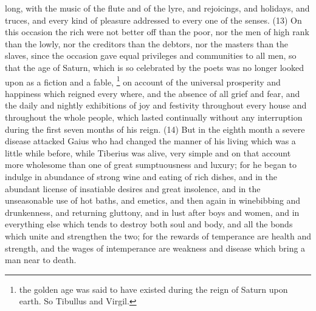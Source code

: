 long, with the music of the flute and of the lyre, and rejoicings, and holidays, and truces, and every
kind of pleasure addressed to every one of the senses. (13) On this occasion the rich were not
better off than the poor, nor the men of high rank than the lowly, nor the creditors than the debtors,
nor the masters than the slaves, since the occasion gave equal privileges and communities to all
men, so that the age of Saturn, which is so celebrated by the poets was no longer looked upon as
a fiction and a fable, \footnote{the golden age was said to have existed during the reign of Saturn upon earth. So Tibullus
and Virgil.} on account of the universal prosperity and happiness which reigned every where, and the
absence of all grief and fear, and the daily and nightly exhibitions of joy and festivity throughout
every house and throughout the whole people, which lasted continually without any interruption
during the first seven months of his reign. (14) But in the eighth month a severe disease attacked
Gaius who had changed the manner of his living which was a little while before, while Tiberius was
alive, very simple and on that account more wholesome than one of great sumptuousness and
luxury; for he began to indulge in abundance of strong wine and eating of rich dishes, and in the
abundant license of insatiable desires and great insolence, and in the unseasonable use of hot
baths, and emetics, and then again in winebibbing and drunkenness, and returning gluttony, and in
lust after boys and women, and in everything else which tends to destroy both soul and body, and
all the bonds which unite and strengthen the two; for the rewards of temperance are health and
strength, and the wages of intemperance are weakness and disease which bring a man near to
death.

